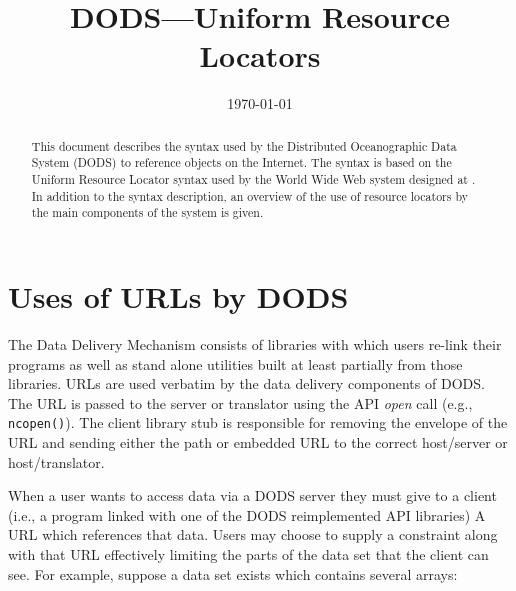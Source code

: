 %
%
%





\title{DODS---Uniform Resource Locators}
\author{}
\date{\today}

\maketitle

\begin{abstract}

  This document describes the syntax used by the Distributed Oceanographic
  Data System (DODS) to reference objects on the Internet. The syntax is
  based on the Uniform Resource Locator syntax used by the World Wide Web
  system designed at \CERN\@. In addition to the syntax description, an
  overview of the use of resource locators by the main components of the
  system is given.

\end{abstract}

\newpage

\section{Uses of URLs by DODS}

The Data Delivery Mechanism consists of libraries with which users re-link
their programs as well as stand alone utilities built at least partially from
those libraries. URLs are used verbatim by the data delivery components of
DODS\@. The URL is passed to the server or translator using the API {\em
  open\/} call (e.g., {\tt ncopen()}). The client library stub is responsible
for removing the envelope of the URL and sending either the path or embedded
URL to the correct host/server or host/translator.

When a user wants to access data via a DODS server they must give to a client
(i.e., a program linked with one of the DODS reimplemented API libraries) A
URL which references that data. Users may choose to supply a constraint along
with that URL effectively limiting the parts of the data set that the client
can see. For example, suppose a data set exists which contains several
arrays:


